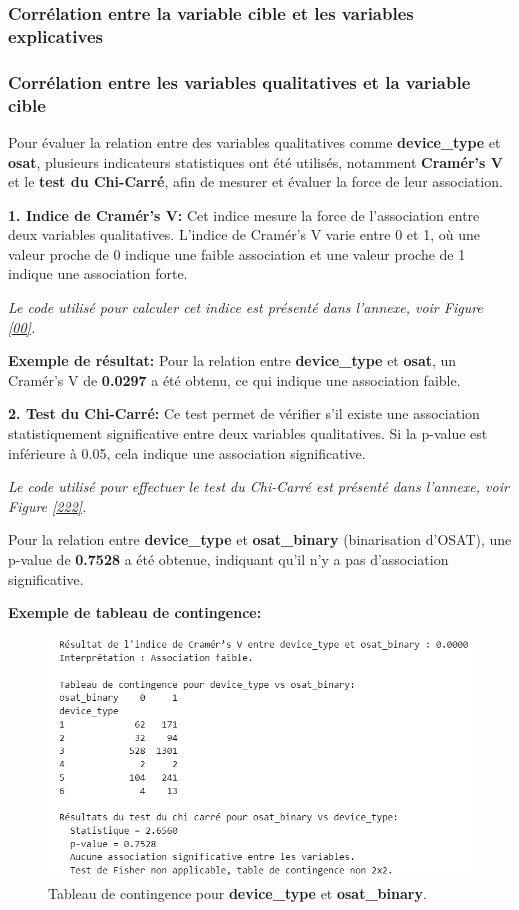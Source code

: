 \subsubsection{Corrélation entre la variable cible et les variables explicatives}
\subsubsection*{Corrélation entre les variables qualitatives et la variable cible}

Pour évaluer la relation entre des variables qualitatives comme \textbf{device\_type} et \textbf{osat}, plusieurs indicateurs statistiques ont été utilisés, notamment \textbf{Cramér's V} et le \textbf{test du Chi-Carré}, afin de mesurer et évaluer la force de leur association.

\textbf{1. Indice de Cramér’s V:} Cet indice mesure la force de l'association entre deux variables qualitatives. L'indice de Cramér’s V varie entre 0 et 1, où une valeur proche de 0 indique une faible association et une valeur proche de 1 indique une association forte.

\textit{Le code utilisé pour calculer cet indice est présenté dans l'annexe, voir Figure \ref{00}.}

\textbf{\checkmark Exemple de résultat:} Pour la relation entre \textbf{device\_type} et \textbf{osat}, un Cramér's V de \textbf{0.0297} a été obtenu, ce qui indique une association faible.

    
\textbf{2. Test du Chi-Carré:} Ce test permet de vérifier s'il existe une association statistiquement significative entre deux variables qualitatives. Si la p-value est inférieure à 0.05, cela indique une association significative.

\textit{Le code utilisé pour effectuer le test du Chi-Carré est présenté dans l'annexe, voir Figure \ref{222}.}

Pour la relation entre \textbf{device\_type} et \textbf{osat\_binary} (binarisation d'OSAT), une p-value de \textbf{0.7528} a été obtenue, indiquant qu'il n'y a pas d'association significative.

\textbf{\checkmark Exemple de tableau de contingence:}

\begin{figure}[H]
    \centering
    \includegraphics[width=0.6\linewidth]{capture_sas_39.png}
    \caption{Tableau de contingence pour \textbf{device\_type} et \textbf{osat\_binary}.}
\end{figure}

